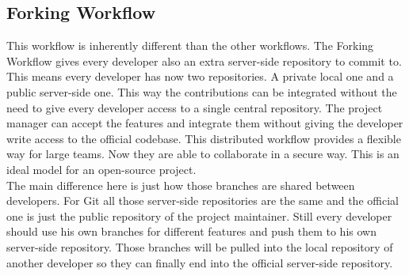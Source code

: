 \subsection{Forking Workflow}

This workflow is inherently different than the other workflows. The Forking
Workflow gives every developer also an extra server-side repository to commit
to. This means every developer has now two repositories. A private local one and
a public server-side one. This way the contributions can be integrated without
the need to give every developer access to a single central repository. The
project manager can accept the features and integrate them without giving the
developer write access to the official codebase. This distributed workflow
provides a flexible way for large teams. Now they are able to collaborate in a
secure way. This is an ideal model for an open-source project.\\

The main difference here is just how those branches are shared between
developers. For Git all those server-side repositories are the same and the
official one is just the public repository of the project maintainer. Still
every developer should use his own branches for different features and push them
to his own server-side repository. Those branches will be pulled into the local
repository of another developer so they can finally end into the official
server-side repository.

